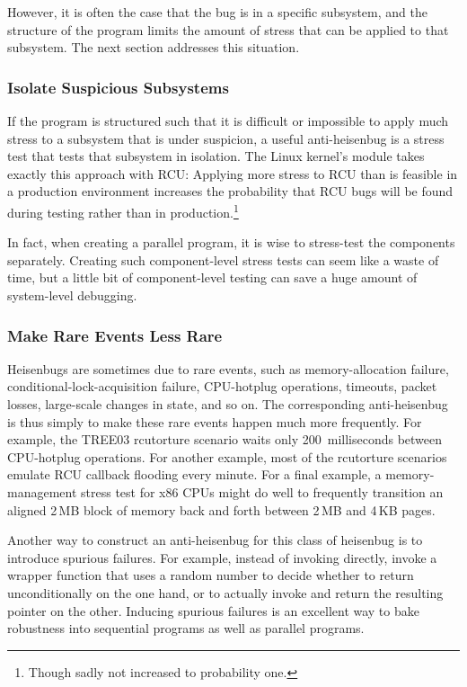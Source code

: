 However, it is often the case that the bug is in a specific subsystem,
and the structure of the program limits the amount of stress that can
be applied to that subsystem.
The next section addresses this situation.

\subsubsection{Isolate Suspicious Subsystems}
\label{sec:debugging:Isolate Suspicious Subsystems}

If the program is structured such that it is difficult or impossible
to apply much stress to a subsystem that is under suspicion,
a useful anti-heisenbug is a stress test that tests that subsystem in
isolation.
The Linux kernel's  module takes exactly this approach with RCU\@:
Applying more stress to RCU than is feasible in a production environment
increases the probability that RCU bugs will be found during testing
rather than in production.\footnote{
	Though sadly not increased to probability one.}

In fact, when creating a parallel program, it is wise to stress-test
the components separately.
Creating such component-level stress tests can seem like a waste of time,
but a little bit of component-level testing can save a huge amount
of system-level debugging.

\subsubsection{Make Rare Events Less Rare}
\label{sec:debugging:Make Rare Events Less Rare}

Heisenbugs are sometimes due to rare events, such as
memory-allocation failure, conditional-lock-acquisition failure,
CPU-hotplug operations, timeouts, packet losses, large-scale changes
in state, and so on.
The corresponding anti-heisenbug is thus simply to make these rare events
happen much more frequently.
For example, the TREE03 rcutorture scenario waits only 200~milliseconds
between CPU-hotplug operations.
For another example, most of the rcutorture scenarios emulate RCU
callback flooding every minute.
For a final example, a memory-management stress test for x86 CPUs might
do well to frequently transition an aligned 2\,MB block of memory back
and forth between 2\,MB and 4\,KB pages.

Another way to construct an anti-heisenbug for this class of heisenbug
is to introduce spurious failures.
For example, instead of invoking  directly, invoke
a wrapper function that uses a random number to decide whether
to return  unconditionally on the one hand, or to actually
invoke  and return the resulting pointer on the other.
Inducing spurious failures is an excellent way to bake robustness into
sequential programs as well as parallel programs.

